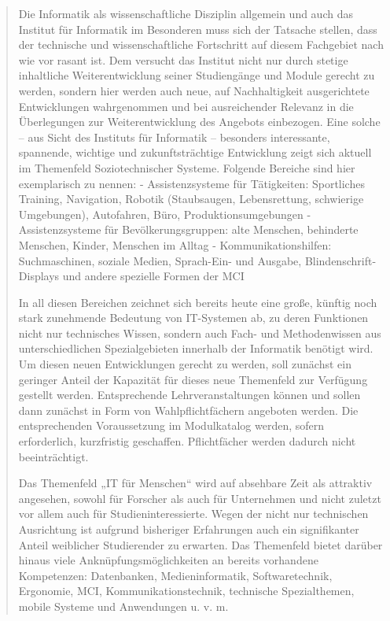 \begin{quote}
Die Informatik als wissenschaftliche Disziplin allgemein und auch das
Institut für Informatik im Besonderen muss sich der Tatsache stellen,
dass der technische und wissenschaftliche Fortschritt auf diesem
Fachgebiet nach wie vor rasant ist. Dem versucht das Institut nicht nur
durch stetige inhaltliche Weiterentwicklung seiner Studiengänge und
Module gerecht zu werden, sondern hier werden auch neue, auf
Nachhaltigkeit ausgerichtete Entwicklungen wahrgenommen und bei
ausreichender Relevanz in die Überlegungen zur Weiterentwicklung des
Angebots einbezogen. Eine solche -- aus Sicht des Instituts für
Informatik -- besonders interessante, spannende, wichtige und
zukunftsträchtige Entwicklung zeigt sich aktuell im Themenfeld
Soziotechnischer Systeme. Folgende Bereiche sind hier exemplarisch zu
nennen: - Assistenzsysteme für Tätigkeiten: Sportliches Training,
Navigation, Robotik (Staubsaugen, Lebensrettung, schwierige Umgebungen),
Autofahren, Büro, Produktionsumgebungen - Assistenzsysteme für
Bevölkerungsgruppen: alte Menschen, behinderte Menschen, Kinder,
Menschen im Alltag - Kommunikationshilfen: Suchmaschinen, soziale
Medien, Sprach-Ein- und Ausgabe, Blindenschrift-Displays und andere
spezielle Formen der MCI

In all diesen Bereichen zeichnet sich bereits heute eine große, künftig
noch stark zunehmende Bedeutung von IT-Systemen ab, zu deren Funktionen
nicht nur technisches Wissen, sondern auch Fach- und Methodenwissen aus
unterschiedlichen Spezialgebieten innerhalb der Informatik benötigt
wird. Um diesen neuen Entwicklungen gerecht zu werden, soll zunächst ein
geringer Anteil der Kapazität für dieses neue Themenfeld zur Verfügung
gestellt werden. Entsprechende Lehrveranstaltungen können und sollen
dann zunächst in Form von Wahlpflichtfächern angeboten werden. Die
entsprechenden Voraussetzung im Modulkatalog werden, sofern
erforderlich, kurzfristig geschaffen. Pflichtfächer werden dadurch nicht
beeinträchtigt.

Das Themenfeld „IT für Menschen`` wird auf absehbare Zeit als attraktiv
angesehen, sowohl für Forscher als auch für Unternehmen und nicht
zuletzt vor allem auch für Studieninteressierte. Wegen der nicht nur
technischen Ausrichtung ist aufgrund bisheriger Erfahrungen auch ein
signifikanter Anteil weiblicher Studierender zu erwarten. Das Themenfeld
bietet darüber hinaus viele Anknüpfungsmöglichkeiten an bereits
vorhandene Kompetenzen: Datenbanken, Medieninformatik, Softwaretechnik,
Ergonomie, MCI, Kommunikationstechnik, technische Spezialthemen, mobile
Systeme und Anwendungen u. v. m.


\end{quote}
